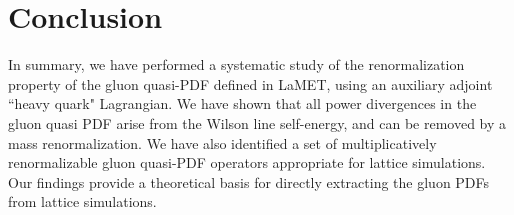 \section{Conclusion}\label{sec:conclusion}

In summary, we have performed a systematic study of the renormalization property of the gluon quasi-PDF defined in LaMET, using an auxiliary adjoint ``heavy quark" Lagrangian. We have shown that all power divergences in the gluon quasi PDF arise from the Wilson line self-energy, and can be removed by a mass renormalization. We have also identified a set of multiplicatively renormalizable gluon quasi-PDF operators appropriate for lattice simulations. Our findings provide a theoretical basis for directly extracting the gluon PDFs from lattice simulations.
